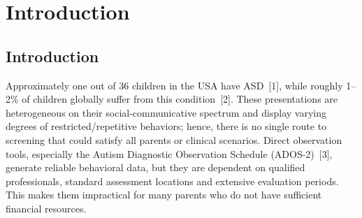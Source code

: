 \documentclass[12pt,a4paper,oneside]{report}
\begin{document}
\clearpage
{}
{}
\tableofcontents

\clearpage
{}
{}
\listoftables

\clearpage
{}
{}
\listoffigures

\clearpage
{}
\setcounter{page}{1}

\chapter{Introduction}

\section{Introduction}

Approximately one out of 36 children in the USA have ASD~[1], while roughly 1–2\% of children globally suffer from this condition~[2]. These presentations are heterogeneous on their social-communicative spectrum and display varying degrees of restricted/repetitive behaviors; hence, there is no single route to screening that could satisfy all parents or clinical scenarios. Direct observation tools, especially the Autism Diagnostic Observation Schedule (ADOS-2)~[3], generate reliable behavioral data, but they are dependent on qualified professionals, standard assessment locations and extensive evaluation periods. This makes them impractical for many parents who do not have sufficient financial resources.
\end{document}
